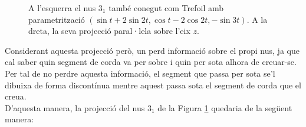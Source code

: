 \begin{figure}
	\centering
	\caption{A l'esquerra el nus $3_1$ també conegut com Trefoil amb parametrització $(\sin t+2\sin 2t, \cos t-2\cos 2t,-\sin 3t)$. A la dreta, la seva projecció paral·lela sobre l'eix $z$.}\label{fig:projecció d'un nus sobre R2}
\end{figure}

Considerant aquesta projecció però, un perd informació sobre el propi nus, ja que cal saber quin segment de corda va per sobre i quin per sota alhora de creuar-se. Per tal de no perdre aquesta informació, el segment que passa per sota se'l dibuixa de forma discontínua mentre aquest passa sota el segment de corda que el creua.\\

\noindent
D'aquesta manera, la projecció del nus $3_1$ de la Figura \ref{fig:projecció d'un nus sobre R2} quedaria de la següent manera:

